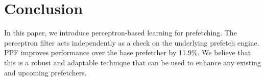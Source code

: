 \section{Conclusion}
\label{Conclusion}
In this paper, we introduce perceptron-based learning for prefetching.  The
perceptron filter acts independently as a check on the underlying prefetch
engine.  PPF improves performance over the base prefetcher by 11.9\%.  We
believe that this is a robust and adaptable technique that can be used to
enhance any existing and upcoming prefetchers.
